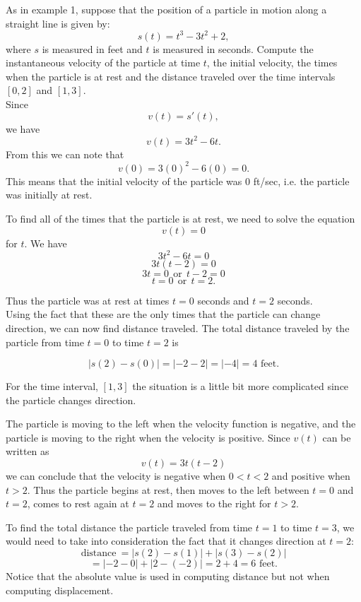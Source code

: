 \documentclass[handout]{ximera}
\begin{document}
 
\begin{example}[example 2] As in example 1, suppose that the position of a particle in motion along a 
straight line is given by:
\[s(t) = t^3 - 3t^2 + 2,\]
where $s$ is measured in feet and $t$ is measured in seconds.
Compute the instantaneous velocity of the particle at time $t$, the initial velocity, the times when the particle 
is at rest and the distance traveled over the time intervals $[0,2]$ and $[1,3]$.\\


Since 
\[v(t) = s'(t),\]
we have
\[v(t) = 3t^2 - 6t.\]
From this we can note that
\[v(0) = 3(0)^2 - 6(0) = 0.\]
This means that the initial velocity of the particle was 0 ft/sec, i.e. the particle was initially at rest.  

To find all of the times that the particle is at rest, we need to solve the equation
\[v(t) = 0\]
for $t$.  
We have
\[3t^2 - 6t = 0\]
\[3t(t-2) = 0\]
\[3t = 0 \ \ \text{or} \ \ t-2 = 0\]
\[t = 0 \ \ \text{or} \ \ t = 2.\]

Thus the particle was at rest at times $t = 0$ seconds and $t = 2$ seconds.\\

Using the fact that these are the only times that the particle can change direction, we can now find distance traveled.
The total distance traveled by the particle from time $t=0$ to time $t=2$ is 

\[|s(2) - s(0)| = |-2 - 2| = |-4| = 4 \text{ feet.}\]

For the time interval, $[1,3]$ the situation is a little bit more complicated since the particle changes direction.

The particle is moving to the left when the velocity function is negative, and the particle is moving to the right when the 
velocity is positive. Since $v(t)$ can be written as
\[v(t) = 3t(t-2)\]
we can conclude that the velocity is negative when $0<t<2$ and positive when $t>2$.
Thus the particle begins at rest, then moves to the left between $t = 0$ and $t = 2$, comes to rest again at $t=2$
and moves to the right for $t>2$.

To find the total distance the particle traveled from time $t = 1$ to time $t = 3$, we would need to take into consideration
the fact that it changes direction at $t = 2$:
\[ \text{distance} \  = |s(2) - s(1)| + |s(3) -s(2)|\]
\[= |-2-0|+|2-(-2)| = 2 + 4 = 6  \text{ feet}.\]
Notice that the absolute value is used in computing distance but not when computing displacement.





\end{example}
\end{document}
